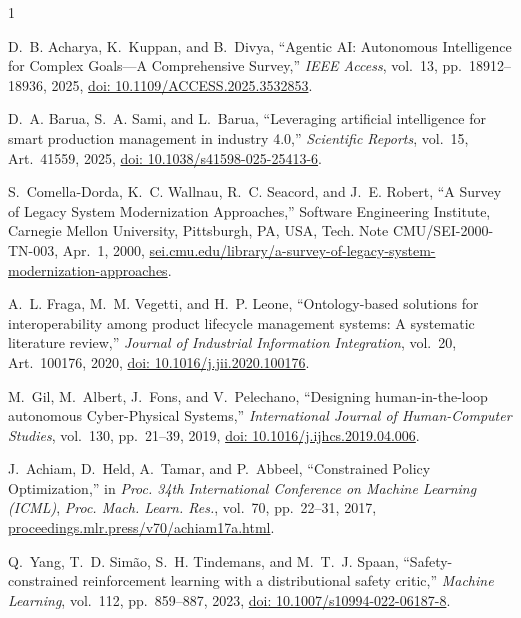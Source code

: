 \documentclass[conference]{IEEEtran}
\begin{document}

\begin{thebibliography}{1}

D.~B. Acharya, K.~Kuppan, and B.~Divya,
``Agentic AI: Autonomous Intelligence for Complex Goals---A Comprehensive Survey,''
\emph{IEEE Access}, vol.~13, pp.~18912--18936, 2025,
\href{https://doi.org/10.1109/ACCESS.2025.3532853}{doi: 10.1109/ACCESS.2025.3532853}.

D.~A. Barua, S.~A. Sami, and L.~Barua,
``Leveraging artificial intelligence for smart production management in industry 4.0,''
\emph{Scientific Reports}, vol.~15, Art.~41559, 2025,
\href{https://doi.org/10.1038/s41598-025-25413-6}{doi: 10.1038/s41598-025-25413-6}.

S.~Comella-Dorda, K.~C. Wallnau, R.~C. Seacord, and J.~E. Robert,
``A Survey of Legacy System Modernization Approaches,''
Software Engineering Institute, Carnegie Mellon University, Pittsburgh, PA, USA, Tech. Note CMU/SEI-2000-TN-003, Apr.~1, 2000,
\href{https://www.sei.cmu.edu/library/a-survey-of-legacy-system-modernization-approaches/}{sei.cmu.edu/library/a-survey-of-legacy-system-modernization-approaches}.

A.~L. Fraga, M.~M. Vegetti, and H.~P. Leone,
``Ontology-based solutions for interoperability among product lifecycle management systems: A systematic literature review,''
\emph{Journal of Industrial Information Integration}, vol.~20, Art.~100176, 2020,
\href{https://doi.org/10.1016/j.jii.2020.100176}{doi: 10.1016/j.jii.2020.100176}.

M.~Gil, M.~Albert, J.~Fons, and V.~Pelechano,
``Designing human-in-the-loop autonomous Cyber-Physical Systems,''
\emph{International Journal of Human-Computer Studies}, vol.~130, pp.~21--39, 2019,
\href{https://doi.org/10.1016/j.ijhcs.2019.04.006}{doi: 10.1016/j.ijhcs.2019.04.006}.

J.~Achiam, D.~Held, A.~Tamar, and P.~Abbeel,
``Constrained Policy Optimization,''
in \emph{Proc. 34th International Conference on Machine Learning (ICML)}, \emph{Proc. Mach. Learn. Res.}, vol.~70, pp.~22--31, 2017,
\href{https://proceedings.mlr.press/v70/achiam17a.html}{proceedings.mlr.press/v70/achiam17a.html}.

Q.~Yang, T.~D. Sim\~ao, S.~H. Tindemans, and M.~T.~J. Spaan,
``Safety-constrained reinforcement learning with a distributional safety critic,''
\emph{Machine Learning}, vol.~112, pp.~859--887, 2023,
\href{https://doi.org/10.1007/s10994-022-06187-8}{doi: 10.1007/s10994-022-06187-8}.


\end{thebibliography}
\end{document}
